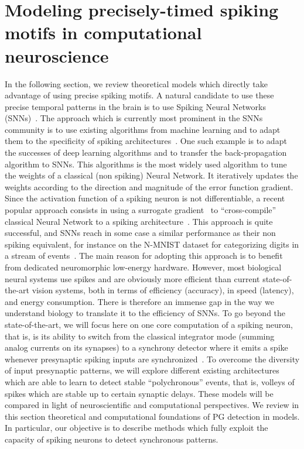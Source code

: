 \documentclass[brainsci, %
               review,submit,pdftex,moreauthors
               ]{Definitions/mdpi}
\begin{document}
\section{Modeling precisely-timed spiking motifs in computational neuroscience}
In the following section, we review theoretical models which directly take advantage of using precise spiking motifs. 
A natural candidate to use these precise temporal patterns in the brain is to use Spiking Neural Networks (SNNs)~\citep{maass_networks_1997}. The approach which is currently most prominent in the SNNs community is to use existing algorithms from machine learning and to adapt them to the specificity of spiking architectures~\citep{goltz_fast_2021}. One such example is to adapt the successes of deep learning algorithms and to transfer the back-propagation algorithm to SNNs. This algorithms is the most widely used algorithm to tune the weights of a classical (non spiking) Neural Network. It iteratively updates the weights according to the direction and magnitude of the error function gradient. Since the activation function of a spiking neuron is not differentiable, a recent popular approach consists in using a surrogate gradient~\citep{neftci_surrogate_2019} to ``cross-compile'' classical Neural Network to a spiking architecture~\citep{rueckauer_conversion_2017}. This approach is quite successful, and SNNs reach in some case a similar performance as their non spiking equivalent, for instance on the N-MNIST dataset for categorizing digits in a stream of events~\citep{susi_nmnsd-spiking_2021}. The main reason for adopting this approach is to benefit from dedicated neuromorphic low-energy hardware. However, most biological neural systems use spikes and are obviously more efficient than current state-of-the-art vision systems, both in terms of efficiency (accuracy), in speed (latency), and energy consumption. There is therefore an immense gap in the way we understand biology to translate it to the efficiency of SNNs.  To go beyond the state-of-the-art, we will focus here on one core computation of a spiking neuron, that is, is its ability to switch from the classical integrator mode (summing analog currents on its synapses) to a synchrony detector where it emits a spike whenever presynaptic spiking inputs are synchronized~\citep{abeles_role_1982,paugam-moisy_computing_2012}. To overcome the diversity of input presynaptic patterns, we will explore different existing architectures which are able to learn to detect stable ``polychronous'' events, that is, volleys of spikes which are stable up to certain synaptic delays. These models will be compared in light of neuroscientific and computational perspectives. We review in this section theoretical and computational foundations of PG detection in models. In particular, our objective is to describe methods which fully exploit the capacity of spiking neurons to detect synchronous patterns.
\end{document}
